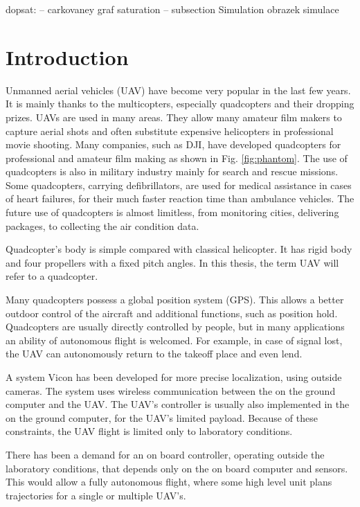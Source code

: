 \documentclass[a4paper,11pt,titlepage]{article}
\begin{document}
dopsat:
-- carkovaney graf saturation
-- subsection Simulation obrazek simulace

\section{Introduction}
Unmanned aerial vehicles (UAV) have become very popular in the last few years. It is mainly thanks to the multicopters, especially quadcopters and their dropping prizes. UAVs are used in many areas. They allow many amateur film makers to capture aerial shots and often substitute expensive helicopters in professional movie shooting. Many companies, such as DJI, have developed quadcopters for professional and amateur film making as shown in Fig. \ref{fig:phantom}. The use of quadcopters is also in military industry\cite{military} mainly for search and rescue missions. Some quadcopters\cite{tu_delft}, carrying defibrillators, are used for medical assistance in cases of heart failures, for their much faster reaction time than ambulance vehicles. The future use of quadcopters is almost limitless, from monitoring cities, delivering packages, to collecting the air condition data. 

Quadcopter's body is simple compared with classical helicopter. It has rigid body and four propellers with a fixed pitch angles. In this thesis, the term UAV will refer to a quadcopter.

Many quadcopters possess a global position system (GPS). This allows a better outdoor control of the aircraft and additional functions, such as position hold. Quadcopters are usually directly controlled by people, but in many applications an ability of autonomous flight is welcomed. For example, in case of signal lost, the UAV can autonomously return to the takeoff place and even lend.

A system Vicon has been developed for more precise localization, using outside cameras. The system uses wireless communication between the on the ground computer and the UAV. The UAV's controller is usually also implemented in the on the ground computer, for the UAV's limited payload. Because of these constraints, the UAV flight is limited only to laboratory conditions.

There has been a demand for an on board controller, operating outside the laboratory conditions, that depends only on the on board computer and sensors. This would allow a fully autonomous flight, where some high level unit plans trajectories for a single or multiple UAV's.
\end{document}
